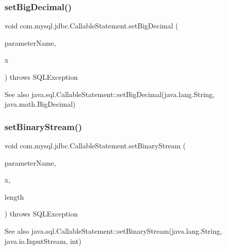 \subsubsection{\texorpdfstring{set\+Big\+Decimal()}{setBigDecimal()}}
{\footnotesize\ttfamily void com.\+mysql.\+jdbc.\+Callable\+Statement.\+set\+Big\+Decimal (\begin{DoxyParamCaption}\item[{String}]{parameter\+Name,  }\item[{Big\+Decimal}]{x }\end{DoxyParamCaption}) throws S\+Q\+L\+Exception}

\begin{DoxySeeAlso}{See also}
java.\+sql.\+Callable\+Statement\+::set\+Big\+Decimal(java.\+lang.\+String, java.\+math.\+Big\+Decimal) 
\end{DoxySeeAlso}
\mbox{\label{classcom_1_1mysql_1_1jdbc_1_1_callable_statement_aa088adfccacda0a8bc6982eb059471c2}} 
\subsubsection{\texorpdfstring{set\+Binary\+Stream()}{setBinaryStream()}}
{\footnotesize\ttfamily void com.\+mysql.\+jdbc.\+Callable\+Statement.\+set\+Binary\+Stream (\begin{DoxyParamCaption}\item[{String}]{parameter\+Name,  }\item[{Input\+Stream}]{x,  }\item[{int}]{length }\end{DoxyParamCaption}) throws S\+Q\+L\+Exception}

\begin{DoxySeeAlso}{See also}
java.\+sql.\+Callable\+Statement\+::set\+Binary\+Stream(java.\+lang.\+String, java.\+io.\+Input\+Stream, int) 
\end{DoxySeeAlso}
\mbox{\label{classcom_1_1mysql_1_1jdbc_1_1_callable_statement_a66c023a50fac7d7caadc0b4d0c60e5aa}} 
